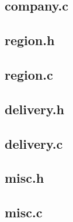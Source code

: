 \documentclass[10pt,letterpaper]{article}
\newcommand{\codepath}{src/}
\begin{document}
    \subsection{company.c}
      
    
    \subsection{region.h}
      
    \subsection{region.c}
      
    
    \subsection{delivery.h}
      
    \subsection{delivery.c}
      
    
    \subsection{misc.h}
      
    \subsection{misc.c}
      
\end{document}
